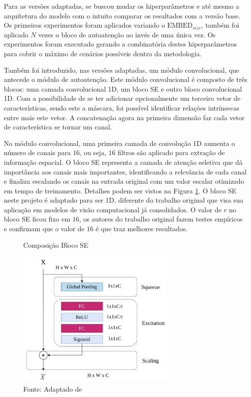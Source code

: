 Para as versões adaptadas, se buscou mudar os hiperparâmetros e até mesmo a arquitetura do modelo com o intuito comparar os resultados com a versão base. Os primeiros experimentos foram aplicados variando o $\text{EMBED}_{size}$, também foi aplicado $N$ vezes o bloco de autoatenção ao invés de uma única vez. Os experimentos foram executado gerando a combinatória destes hiperparâmetros para cobrir o máximo de cenários possíveis dentro da metodologia.

Também foi introduzido, nas versões adaptadas, um módulo convolucional, que antecede o módulo de autoatenção. Este módulo convolucional é composto de três blocos: uma camada convolucional 1D, um bloco \gls{SE} e outro bloco convolucional 1D. Com a possibilidade de se ter adicionar opcionalmente um terceiro vetor de características, sendo este a máscara, foi possível identificar relações intrínsecas entre mais este vetor. A concatenação agora na primeira dimensão faz cada vetor de característica se tornar um canal. 

No módulo convolucional, uma primeira camada de convolução 1D aumenta o número de canais para $16$, ou seja, $16$ filtros são aplicado para extração de informação espacial. O bloco \gls{SE} representa a camada de atenção seletiva que dá importância aos canais mais importantes, identificando a relevância de cada canal e finaliza escalando os canais na entrada original com um valor escalar otimizado em tempo de treinamento. Detalhes podem ser vistos na Figura \ref{fig:fig031}. O bloco \gls{SE} neste projeto é adaptado para ser 1D, diferente do trabalho original que visa sua aplicação em modelos de visão computacional já consolidados. O valor de $r$ no bloco \gls{SE} ficou fixo em $16$, os autores do trabalho original fazem testes empíricos e confirmam que o valor de $16$ é que traz melhores resultados.

\begin{figure}[h!]
    \centering
    \caption{Composição Bloco SE}
    \includegraphics[width=0.7\textwidth]{figures/fig031.png}
    \caption*{Fonte: Adaptado de \cite{lafraxoSEDARUnetSqueezeexcitationDilated2024}}
    \label{fig:fig031}
\end{figure}


